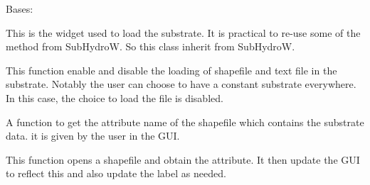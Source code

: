 \documentclass[letterpaper,10pt,english]{sphinxmanual}
\begin{document}

\begin{fulllineitems}
\label{\detokenize{index:src_GUI.hydro_GUI_2.SubstrateW}}
Bases: {\hyperref[\detokenize{index:src_GUI.hydro_GUI_2.SubHydroW}]{}}

This is the widget used to load the substrate. It is practical to re-use some of the method from SubHydroW.
So this class inherit from SubHydroW.

\begin{fulllineitems}
\label{\detokenize{index:src_GUI.hydro_GUI_2.SubstrateW.enabledisable_const}}
This function enable and disable the loading of shapefile and text file in the substrate. Notably
the user can choose to have a constant substrate everywhere. In this case, the choice to load the file is
disabled.

\end{fulllineitems}


\begin{fulllineitems}
\label{\detokenize{index:src_GUI.hydro_GUI_2.SubstrateW.get_att_name}}
A function to get the attribute name of the shapefile which contains the substrate data. it is given by the user
in the GUI.

\end{fulllineitems}


\begin{fulllineitems}
\label{\detokenize{index:src_GUI.hydro_GUI_2.SubstrateW.get_attribute_from_shp}}
This function opens a shapefile and obtain the attribute. It then update the GUI
to reflect this and also update the label as needed.

\end{fulllineitems}



\end{fulllineitems}
\end{document}
